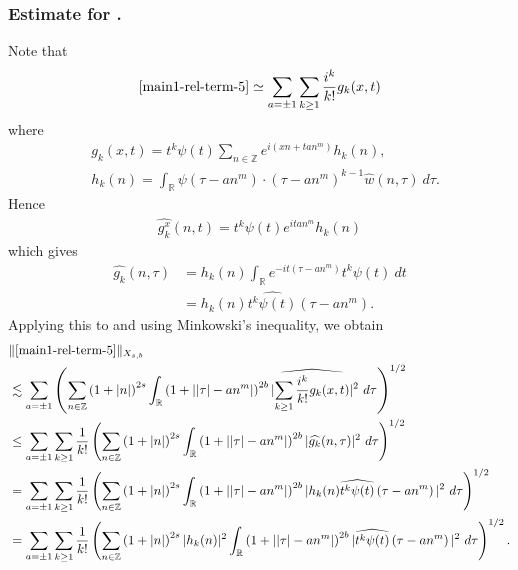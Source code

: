 \documentclass[12pt,reqno]{amsart}
\numberwithin{equation}{section}  %
\renewcommand{\cref}{\Cref}
\newcommand{\rr}{\mathbb{R}}
\newcommand{\zz}{\mathbb{Z}}
\newcommand{\wh}{\widehat}
\begin{document}
\subsubsection{Estimate for \cref{main1-rel-term-5}.}
Note that
%
%
\begin{equation}
	\label{1n}
	\begin{split}
    \cref{main1-rel-term-5} \simeq \sum_{a = \pm 1}\sum_{k \ge 1}
		\frac{i^k}{k!}g_k(x,t)
	\end{split}
\end{equation}
%
%
where 
%
%
\begin{equation*}
	\begin{split}
		& g_k(x,t) = t^k \psi(t) \sum_{n \in \zz} e^{i\left( xn + ta n^{m}
		\right)} h_k(n),
		\\
		& h_k(n) = \int_\rr \psi \left( \tau - an^{m} \right) \cdot \left(
		\tau - an^{m} \right)^{k -1} \wh{w}(n, \tau) \ d \tau.
	\end{split}
\end{equation*}
%
%
Hence
%
%
\begin{equation*}
	\begin{split}
		\wh{g_k^x}(n, t) = t^{k} \psi(t) e^{i t an^{m}} h_k(n)
	\end{split}
\end{equation*}
%
%
which gives
%
%
\begin{equation*}
	\begin{split}
		\wh{g_k}(n, \tau)
		& = h_k(n) \int_\rr e^{-it\left( \tau - an^{m} \right)}
		t^{k}\psi(t) \ dt
		\\
		& = h_k(n) \wh{t^{k}\psi(t)} \left( \tau - an^{m} \right).
	\end{split}
\end{equation*}
%
%
Applying this to \cref{1n} and using Minkowski's inequality, we obtain
%
%
\begin{equation}
	\label{2n}
	\begin{split}
		& \|\cref{main1-rel-term-5}\|_{X_{s,b}} 
    \\
    & \lesssim \sum_{a = \pm 1} \left( \sum_{n \in \zz} \left (1 + |n| \right )^{2s}
    \int_\rr \left( 1 + | |\tau| - an^{m} | \right)^{2b}
    | \wh{\sum_{k \ge 1} \frac{i^k}{k!}g_k(x,t)} |^2 \ d \tau
		\right)^{1/2}
		\\
		& \le \sum_{a = \pm 1}\sum_{k \ge 1} \frac{1}{k!}\left( \sum_{n \in \zz} \left (1 + |n| \right )^{2s}
    \int_\rr \left( 1 + | |\tau| - an^{m} | \right)^{2b} | \wh{g_k}(n, \tau) |^2 \
		d \tau \right)^{1/2}
		\\
		& = \sum_{a = \pm 1}\sum_{k \ge 1} \frac{1}{k!} \left( \sum_{n \in \zz} \left (1 + |n| \right )^{2s}
    \int_\rr \left( 1 + | |\tau| - an^{m} | \right)^{2b} | h_k(n) \wh{t^k
		\psi(t)} \left( \tau - an^{m} \right) |^2 \ d \tau \right)^{1/2}
		\\
		& = \sum_{a = \pm 1}\sum_{k \ge 1} \frac{1}{k!} \left( \sum_{n \in \zz} \left (1 + |n| \right )^{2s} |
    h_k(n) |^2 \int_\rr \left( 1 + | |\tau| - an^{m} | \right)^{2b} | \wh{t^k
		\psi(t)} \left( \tau - an^{m} \right) |^2 \ d \tau \right)^{1/2}.
	\end{split}
\end{equation}
\end{document}

